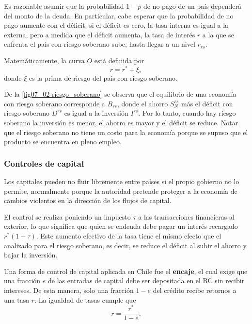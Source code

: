 \documentclass[DeGregorioResumen]{subfiles}
\begin{document}
Es razonable asumir que la probabilidad $1-p$ de no pago de un país dependerá del monto de la deuda. En particular, cabe esperar que la probabilidad de no pago aumente con el déficit: si el déficit es cero, la tasa interna es igual a la externa, pero a medida que el déficit aumenta, la tasa de interés $r$ a la que se enfrenta el país con riesgo soberano sube, hasta llegar a un nivel $r_{rs}$.



Matemáticamente, la curva $O$ está definida por
\begin{equation*}
r=r^*+\xi,
\end{equation*}
donde $\xi$ es la prima de riesgo del país con riesgo soberano.

De la \autoref{fig07_02-riesgo_soberano} se observa que el equilibrio de una economía con riesgo soberano corresponde a $B_{rs}$, donde el ahorro $S_N^{rs}$ más el déficit con riesgo soberano $D^{rs}$ es igual a la inversión $I^{rs}$. Por lo tanto, cuando hay riesgo soberano la inversión es menor, el ahorro es mayor y el déficit se reduce. Notar que el riesgo soberano no tiene un costo para la economía porque se supuso que el producto se encuentra en pleno empleo.

\subsubsection*{Controles de capital}

Los capitales pueden no fluir libremente entre países si el propio gobierno no lo permite, normalmente porque la autoridad pretende proteger a la economía de cambios violentos en la dirección de los flujos de capital.

El control se realiza poniendo un impuesto $\tau$ a las transacciones financieras al exterior, lo que significa que quien se endeuda debe pagar un interés recargado $r^*(1+\tau)$. Este aumento efectivo de la tasa tiene el mismo efecto que el analizado para el riesgo soberano, es decir, se reduce el déficit al subir el ahorro y bajar la inversión.

Una forma de control de capital aplicada en Chile fue el \textbf{encaje}, el cual exige que una fracción $e$ de las entradas de capital debe ser depositada en el BC sin recibir intereses. De esta manera, solo una fracción $1-e$ del crédito recibe retornos a una tasa $r$. La igualdad de tasas cumple que
\begin{equation*}
r= \frac{r^*}{1-e}.
\end{equation*}
\end{document}

